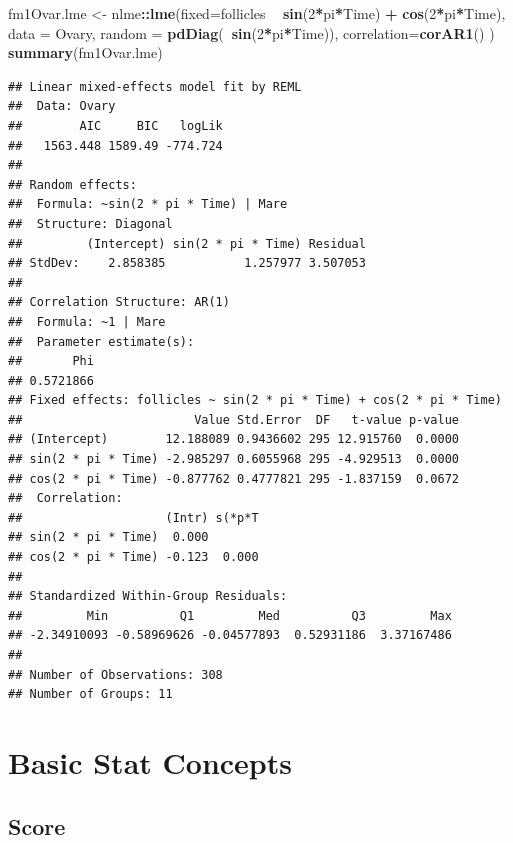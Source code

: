 \documentclass[]{book}
\newenvironment{Shaded}{\begin{snugshade}}{\end{snugshade}}
\newcommand{\KeywordTok}[1]{\textcolor[rgb]{0.13,0.29,0.53}{\textbf{#1}}}
\newcommand{\DataTypeTok}[1]{\textcolor[rgb]{0.13,0.29,0.53}{#1}}
\newcommand{\DecValTok}[1]{\textcolor[rgb]{0.00,0.00,0.81}{#1}}
\newcommand{\StringTok}[1]{\textcolor[rgb]{0.31,0.60,0.02}{#1}}
\newcommand{\OperatorTok}[1]{\textcolor[rgb]{0.81,0.36,0.00}{\textbf{#1}}}
\newcommand{\NormalTok}[1]{#1}
\begin{document}
\begin{Shaded}
\begin{Highlighting}[]
\NormalTok{fm1Ovar.lme <-}\StringTok{ }\NormalTok{nlme}\OperatorTok{::}\KeywordTok{lme}\NormalTok{(}\DataTypeTok{fixed=}\NormalTok{follicles }\OperatorTok{~}\StringTok{ }\KeywordTok{sin}\NormalTok{(}\DecValTok{2}\OperatorTok{*}\NormalTok{pi}\OperatorTok{*}\NormalTok{Time) }\OperatorTok{+}\StringTok{ }\KeywordTok{cos}\NormalTok{(}\DecValTok{2}\OperatorTok{*}\NormalTok{pi}\OperatorTok{*}\NormalTok{Time), }
                   \DataTypeTok{data =}\NormalTok{ Ovary, }
                   \DataTypeTok{random =} \KeywordTok{pdDiag}\NormalTok{(}\OperatorTok{~}\KeywordTok{sin}\NormalTok{(}\DecValTok{2}\OperatorTok{*}\NormalTok{pi}\OperatorTok{*}\NormalTok{Time)), }
                   \DataTypeTok{correlation=}\KeywordTok{corAR1}\NormalTok{() )}
\KeywordTok{summary}\NormalTok{(fm1Ovar.lme)}
\end{Highlighting}
\end{Shaded}

\begin{verbatim}
## Linear mixed-effects model fit by REML
##  Data: Ovary 
##        AIC     BIC   logLik
##   1563.448 1589.49 -774.724
## 
## Random effects:
##  Formula: ~sin(2 * pi * Time) | Mare
##  Structure: Diagonal
##         (Intercept) sin(2 * pi * Time) Residual
## StdDev:    2.858385           1.257977 3.507053
## 
## Correlation Structure: AR(1)
##  Formula: ~1 | Mare 
##  Parameter estimate(s):
##       Phi 
## 0.5721866 
## Fixed effects: follicles ~ sin(2 * pi * Time) + cos(2 * pi * Time) 
##                        Value Std.Error  DF   t-value p-value
## (Intercept)        12.188089 0.9436602 295 12.915760  0.0000
## sin(2 * pi * Time) -2.985297 0.6055968 295 -4.929513  0.0000
## cos(2 * pi * Time) -0.877762 0.4777821 295 -1.837159  0.0672
##  Correlation: 
##                    (Intr) s(*p*T
## sin(2 * pi * Time)  0.000       
## cos(2 * pi * Time) -0.123  0.000
## 
## Standardized Within-Group Residuals:
##         Min          Q1         Med          Q3         Max 
## -2.34910093 -0.58969626 -0.04577893  0.52931186  3.37167486 
## 
## Number of Observations: 308
## Number of Groups: 11
\end{verbatim}

\chapter{Basic Stat Concepts}\label{basic-stat-concepts}

\section{Score}\label{score}
\end{document}
